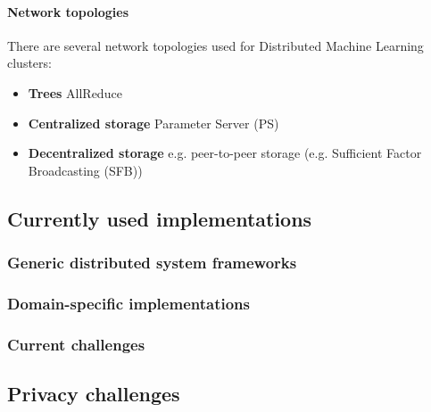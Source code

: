 \paragraph{Network topologies}
There are several network topologies used for Distributed Machine Learning clusters:
\begin{itemize}
	\item \textbf{Trees} AllReduce\cite{Agar14}
	\item \textbf{Centralized storage} Parameter Server (PS)\cite{Agar14}
	\item \textbf{Decentralized storage} e.g. peer-to-peer storage (e.g. Sufficient Factor Broadcasting (SFB)\cite{Li13})
\end{itemize}










\subsection{Currently used implementations}
\subsubsection{Generic distributed system frameworks}
\subsubsection{Domain-specific implementations}
\subsubsection{Current challenges}










\subsection{Privacy challenges}
